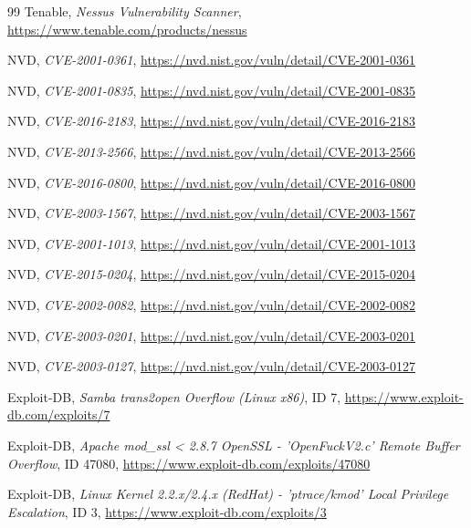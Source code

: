\documentclass[12pt, a4paper]{article}
\begin{document}
\begin{thebibliography}{99}
		Tenable, \emph{Nessus Vulnerability Scanner},
		\url{https://www.tenable.com/products/nessus}
		
		NVD, \emph{CVE-2001-0361},
		\url{https://nvd.nist.gov/vuln/detail/CVE-2001-0361}
		
		NVD, \emph{CVE-2001-0835},
		\url{https://nvd.nist.gov/vuln/detail/CVE-2001-0835}
		
		NVD, \emph{CVE-2016-2183},
		\url{https://nvd.nist.gov/vuln/detail/CVE-2016-2183}
		
		NVD, \emph{CVE-2013-2566},
		\url{https://nvd.nist.gov/vuln/detail/CVE-2013-2566}
		
		NVD, \emph{CVE-2016-0800},
		\url{https://nvd.nist.gov/vuln/detail/CVE-2016-0800}
		
		NVD, \emph{CVE-2003-1567},
		\url{https://nvd.nist.gov/vuln/detail/CVE-2003-1567}
		
		NVD, \emph{CVE-2001-1013},
		\url{https://nvd.nist.gov/vuln/detail/CVE-2001-1013}
		
		NVD, \emph{CVE-2015-0204},
		\url{https://nvd.nist.gov/vuln/detail/CVE-2015-0204}
		
		NVD, \emph{CVE-2002-0082},
		\url{https://nvd.nist.gov/vuln/detail/CVE-2002-0082}
		
		NVD, \emph{CVE-2003-0201},
		\url{https://nvd.nist.gov/vuln/detail/CVE-2003-0201}
		
		NVD, \emph{CVE-2003-0127},
		\url{https://nvd.nist.gov/vuln/detail/CVE-2003-0127}
		
		
		Exploit-DB, \emph{Samba trans2open Overflow (Linux x86)}, ID 7,
		\url{https://www.exploit-db.com/exploits/7}
		
		Exploit-DB, \emph{Apache mod\_ssl < 2.8.7 OpenSSL - 'OpenFuckV2.c' Remote Buffer Overflow}, ID 47080,
		\url{https://www.exploit-db.com/exploits/47080}
		
		Exploit-DB, \emph{Linux Kernel 2.2.x/2.4.x (RedHat) - 'ptrace/kmod' Local Privilege Escalation}, ID 3,
		\url{https://www.exploit-db.com/exploits/3}
		
	\end{thebibliography}
	
\end{document}
